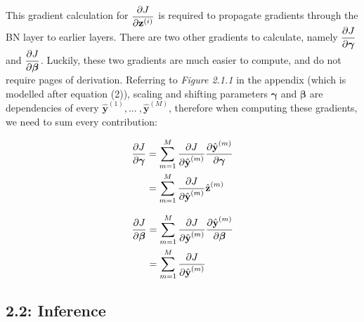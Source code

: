 \documentclass{article}
\begin{document}
\begin{multicols*}{2}
This gradient calculation for $\begin{aligned}
    {\partial J \over \partial \textbf{z}^{(i)}}
\end{aligned}$ is required to propagate gradients through the BN layer to 
earlier layers. There are two other gradients to calculate, namely $\begin{aligned}
    {\partial J \over \partial \boldsymbol{\gamma}}
\end{aligned}$ and $\begin{aligned}
    {\partial J \over \partial \boldsymbol{\beta}}
\end{aligned}$. Luckily, these two gradients are much easier to compute, 
and do not require pages of derivation. Referring to \textit{Figure 2.1.1} in 
the appendix (which is modelled after equation (2)), scaling and shifting parameters
$\boldsymbol{\gamma}$ and $\boldsymbol{\beta}$ are dependencies of 
every $\hat{\textbf{y}}^{(1)}, ... \ , \hat{\textbf{y}}^{(M)} $, therefore when 
computing these gradients, we need to sum every contribution:

\begin{equation}
    \begin{aligned}
        {\partial J \over \partial \boldsymbol{\gamma}}
        & =
        \sum_{m=1}^M{\partial J\over \partial \hat{\textbf{y}}^{(m)}}
        {\partial \hat{\textbf{y}}^{(m)} \over \partial \boldsymbol{\gamma}} \\
        & =
        \sum_{m=1}^M{\partial J\over \partial \hat{\textbf{y}}^{(m)}}
        \hat{\textbf{z}}^{(m)} 
    \end{aligned}
\end{equation}

\begin{equation}
    \begin{aligned}
        {\partial J \over \partial \boldsymbol{\beta}}
        & =
        \sum_{m=1}^M{\partial J\over \partial \hat{\textbf{y}}^{(m)}} 
        {\partial \hat{\textbf{y}}^{(m)} \over \partial \boldsymbol{\beta}} \\
        & =
        \sum_{m=1}^M{\partial J\over \partial \hat{\textbf{y}}^{(m)}}
    \end{aligned}
\end{equation}









\subsection*{2.2: Inference}


\end{multicols*}
\end{document}
